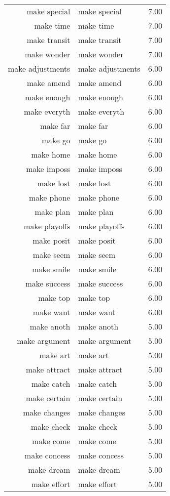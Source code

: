 \begin{table}[ht]
\begin{tabular}{rlr}
  make special & make special & 7.00 \\ 
  make time & make time & 7.00 \\ 
  make transit & make transit & 7.00 \\ 
  make wonder & make wonder & 7.00 \\ 
  make adjustments & make adjustments & 6.00 \\ 
  make amend & make amend & 6.00 \\ 
  make enough & make enough & 6.00 \\ 
  make everyth & make everyth & 6.00 \\ 
  make far & make far & 6.00 \\ 
  make go & make go & 6.00 \\ 
  make home & make home & 6.00 \\ 
  make imposs & make imposs & 6.00 \\ 
  make lost & make lost & 6.00 \\ 
  make phone & make phone & 6.00 \\ 
  make plan & make plan & 6.00 \\ 
  make playoffs & make playoffs & 6.00 \\ 
  make posit & make posit & 6.00 \\ 
  make seem & make seem & 6.00 \\ 
  make smile & make smile & 6.00 \\ 
  make success & make success & 6.00 \\ 
  make top & make top & 6.00 \\ 
  make want & make want & 6.00 \\ 
  make anoth & make anoth & 5.00 \\ 
  make argument & make argument & 5.00 \\ 
  make art & make art & 5.00 \\ 
  make attract & make attract & 5.00 \\ 
  make catch & make catch & 5.00 \\ 
  make certain & make certain & 5.00 \\ 
  make changes & make changes & 5.00 \\ 
  make check & make check & 5.00 \\ 
  make come & make come & 5.00 \\ 
  make concess & make concess & 5.00 \\ 
  make dream & make dream & 5.00 \\ 
  make effort & make effort & 5.00 \\ 

\end{tabular}
\end{table}
